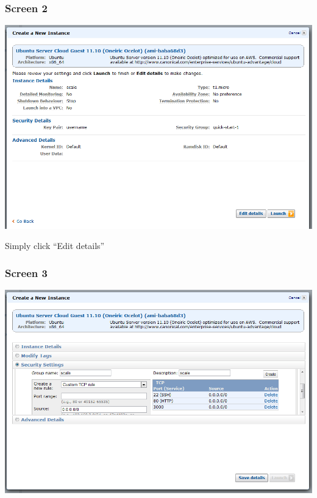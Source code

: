 \documentclass{article}
\begin{document}
\subsubsection*{Screen 2}

\includegraphics[width=6in]{screen2}

Simply click ``Edit details''

\subsubsection*{Screen 3}

\includegraphics[width=6in]{screen3}
\end{document}
